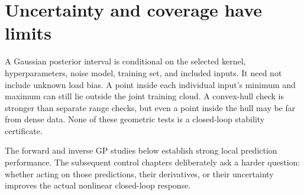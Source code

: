 \section{Uncertainty and coverage have limits}
A Gaussian posterior interval is conditional on the selected kernel, hyperparameters, noise model, training set, and included inputs. It need not include unknown load bias. A point inside each individual input's minimum and maximum can still lie outside the joint training cloud. A convex-hull check is stronger than separate range checks, but even a point inside the hull may be far from dense data. None of these geometric tests is a closed-loop stability certificate.

The forward and inverse GP studies below establish strong local prediction performance. The subsequent control chapters deliberately ask a harder question: whether acting on those predictions, their derivatives, or their uncertainty improves the actual nonlinear closed-loop response.
